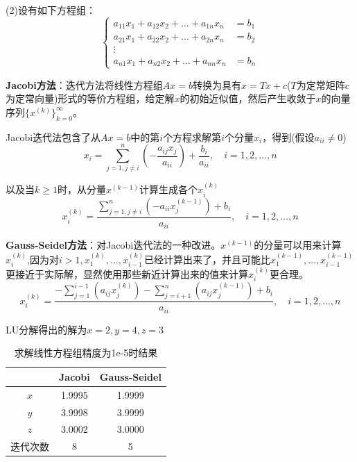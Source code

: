 \documentclass[12pt]{ctexart}
\begin{document}
	(2)设有如下方程组：
	\begin{equation*}
	\left\{
	\begin{aligned}
	a_{11}x_1+a_{12}x_2+\dots+a_{1n}x_n&=b_1 \\
	a_{21}x_1+a_{22}x_2+\dots+a_{2n}x_n&=b_2 \\
	\vdots& \\
	a_{n1}x_1+a_{n2}x_2+\dots+a_{nn}x_n&=b_n
	\end{aligned}
	\right.
	\end{equation*}
	
	\textbf{Jacobi方法}：迭代方法将线性方程组$Ax=b$转换为具有$x=Tx+c$($T$为定常矩阵$c$为定常向量)形式的等价方程组，给定解$x$的初始近似值，然后产生收敛于$x$的向量序列$\{x^{(k)}\}_{k=0}^\infty$。
	
	Jacobi迭代法包含了从$Ax=b$中的第$i$个方程求解第$i$个分量$x_i$，得到(假设$a_{ii}\neq 0$)
	\begin{equation*}
	x_i=\sum_{j=1,j\neq i}^{n}(-\frac{a_{ij}x_j}{a_{ii}})+\frac{b_i}{a_{ii}},\quad i=1,2,\dots,n
	\end{equation*}
	
	以及当$k\geq 1$时，从分量$x^{(k-1)}$计算生成各个$x_i^{(k)}$
	\begin{equation*}
	x_i^{(k)}=\frac{\sum_{j=1,j\neq i}^{n}(-a_{ii}x_j^{(k-1)})+b_i}{a_{ii}},\quad i=1,2,\dots,n
	\end{equation*}
	
	\textbf{Gauss-Seidel方法}：对Jacobi迭代法的一种改进。$x^{(k-1)}$的分量可以用来计算$x_i^{(k)}$,因为对$i>1,x_1^{(k)},\dots,x_{i-1}^{(k)}$已经计算出来了，并且可能比$x_1^{(k-1)},\dots,x_{i-1}^{(k-1)}$更接近于实际解，显然使用那些新近计算出来的值来计算$x_i^{(k)}$更合理。
	\begin{equation*}
	x_i^{(k)}=\frac{-\sum\limits_{j=1}^{i-1}(a_{ij}x_j^{(k)})-\sum\limits_{j=i+1}^{n}(a_{ij}x_j^{(k-1)})+b_i}{a_{ii}},\quad i=1,2,\dots,n
	\end{equation*}
	
	LU分解得出的解为$x=2,y=4,z=3$
	
	\begin{table}[htbp]
		\centering
		\caption{求解线性方程组精度为1e-5时结果}\label{e6_1}
		\begin{tabular}
			{c|c|c}
			\hline
			&Jacobi&Gauss-Seidel \\
			\hline
			$x$&1.9995&1.9999 \\
			\hline
			$y$&3.9998&3.9999 \\
			\hline
			$z$&3.0002&3.0000 \\
			\hline
			迭代次数&8&5 \\
			\hline
		\end{tabular}
	\end{table}
	
\end{document}
